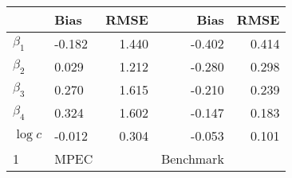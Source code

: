 
\begin{tabular}[t]{llrrr}
\toprule
  & Bias & RMSE & Bias & RMSE\\
\midrule
$\beta_{1}$ & -0.182 & 1.440 & -0.402 & 0.414\\
$\beta_{2}$ & 0.029 & 1.212 & -0.280 & 0.298\\
$\beta_{3}$ & 0.270 & 1.615 & -0.210 & 0.239\\
$\beta_{4}$ & 0.324 & 1.602 & -0.147 & 0.183\\
$\log c$ & -0.012 & 0.304 & -0.053 & 0.101\\
1 & MPEC &  & Benchmark & \\
\bottomrule
\end{tabular}
